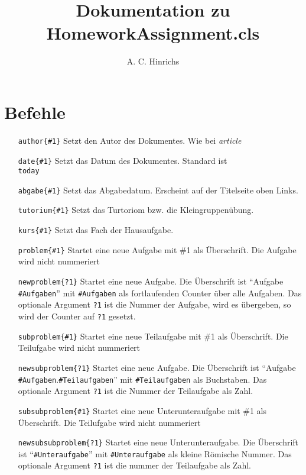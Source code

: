 \documentclass[a4papr]{article}
\title{Dokumentation zu HomeworkAssignment.cls}
\author{A. C. Hinrichs}
\begin{document}
\maketitle
\section{Befehle}
\begin{itemize}
 \item[\texttt{author\{\#1\}}]		Setzt den Autor des Dokumentes. Wie bei \textit{article}
 \item[\texttt{date\{\#1\}}]		Setzt das Datum des Dokumentes. Standard ist \texttt{\\today}
 \item[\texttt{abgabe\{\#1\}}]		Setzt das Abgabedatum. Erscheint auf der Titelseite oben Links.
 \item[\texttt{tutorium\{\#1\}}]	Setzt das Turtoriom bzw. die Kleingruppen\"ubung.	
 \item[\texttt{kurs\{\#1\}}]		Setzt das Fach der Hausaufgabe.	
 \item[\texttt{problem\{\#1\}}] 	Startet eine neue Aufgabe mit \#1 als \"Uberschrift.  Die Aufgabe wird nicht nummeriert
 \item[\texttt{newproblem\{?1\}}] 		Startet eine neue Aufgabe. Die \"Uberschrift ist \enquote{Aufgabe \texttt{\#Aufgaben}} mit \texttt{\#Aufgaben} als fortlaufenden Counter \"uber alle Aufgaben.  Das optionale Argument \texttt{?1} ist die Nummer der Aufgabe, wird es \"ubergeben, so wird der Counter auf \texttt{?1} gesetzt.  
 \item[\texttt{subproblem\{\#1\}}] 	Startet eine neue Teilaufgabe mit \#1 als \"Uberschrift.  Die Teilufgabe wird nicht nummeriert
 \item[\texttt{newsubproblem\{?1\}}] 		Startet eine neue Aufgabe. Die \"Uberschrift ist \enquote{Aufgabe \texttt{\#Aufgaben}.\texttt{\#Teilaufgaben}} mit \texttt{\#Teilaufgaben} als Buchstaben.  Das optionale Argument \texttt{?1} ist die Nummer der Teilaufgabe als Zahl.  
 \item[\texttt{subsubproblem\{\#1\}}] 	Startet eine neue Unterunteraufgabe mit \#1 als \"Uberschrift.  Die Teilufgabe wird nicht nummeriert
 \item[\texttt{newsubsubproblem\{?1\}}] 	Startet eine neue Unterunteraufgabe. Die \"Uberschrift ist \enquote{\texttt{\#Unteraufgabe}} mit \texttt{\#Unteraufgabe} als kleine R\"omische Nummer.  Das optionale Argument \texttt{?1} ist die nummer der Teilaufgabe als Zahl.
\end{itemize}
\end{document}
